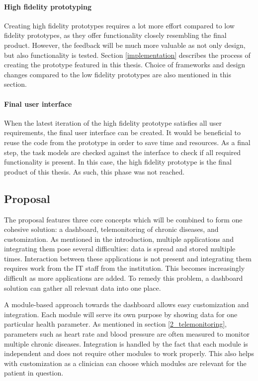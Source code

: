         \paragraph{High fidelity prototyping} Creating high fidelity prototypes requires a lot more effort compared to low fidelity prototypes, as they offer functionality closely resembling the final product. However, the feedback will be much more valuable as not only design, but also functionality is tested. Section \ref{implementation} describes the process of creating the prototype featured in this thesis. Choice of frameworks and design changes compared to the low fidelity prototypes are also mentioned in this section.

        \paragraph{Final user interface} When the latest iteration of the high fidelity prototype satisfies all user requirements, the final user interface can be created. It would be beneficial to reuse the code from the prototype in order to save time and resources. As a final step, the task models are checked against the interface to check if all required functionality is present. In this case, the high fidelity prototype is the final product of this thesis. As such, this phase was not reached.

    \subsection{Proposal}
    
    The proposal features three core concepts which will be combined to form one cohesive solution: a dashboard, telemonitoring of chronic diseases, and customization. As mentioned in the introduction, multiple applications and integrating them pose several difficulties: data is spread and stored multiple times. Interaction between these applications is not present and integrating them requires work from the IT staff from the institution. This becomes increasingly difficult as more applications are added. To remedy this problem, a dashboard solution can gather all relevant data into one place.

    A module-based approach towards the dashboard allows easy customization and integration. Each module will serve its own purpose by showing data for one particular health parameter. As mentioned in section \ref{2_telemonitoring}, parameters such as heart rate and blood pressure are often measured to monitor multiple chronic diseases. Integration is handled by the fact that each module is independent and does not require other modules to work properly. This also helps with customization as a clinician can choose which modules are relevant for the patient in question.

